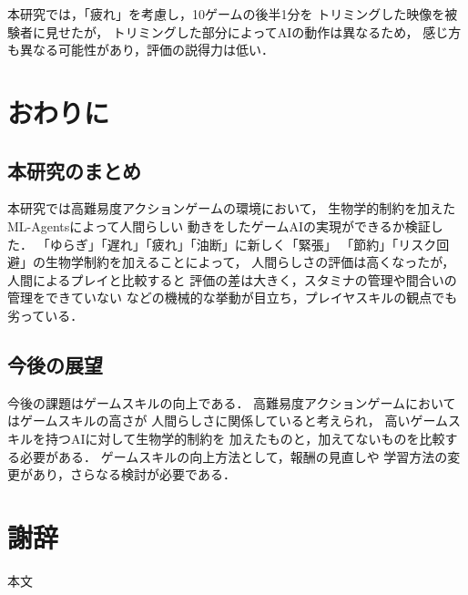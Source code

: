 \documentclass[a4paper,12pt,oneside,openany,titlepage]{jreport}
\begin{document}
本研究では，「疲れ」を考慮し，10ゲームの後半1分を
トリミングした映像を被験者に見せたが，
トリミングした部分によってAIの動作は異なるため，
感じ方も異なる可能性があり，評価の説得力は低い．


\chapter{おわりに}
\thispagestyle{fancy}
\lhead{\leftmark}
\rhead{\thepage}
\renewcommand{\headrulewidth}{1pt}

\section{本研究のまとめ}
本研究では高難易度アクションゲームの環境において，
生物学的制約を加えたML-Agentsによって人間らしい
動きをしたゲームAIの実現ができるか検証した．
「ゆらぎ」「遅れ」「疲れ」「油断」に新しく「緊張」
「節約」「リスク回避」の生物学制約を加えることによって，
人間らしさの評価は高くなったが，人間によるプレイと比較すると
評価の差は大きく，スタミナの管理や間合いの管理をできていない
などの機械的な挙動が目立ち，プレイヤスキルの観点でも劣っている．

\section{今後の展望}
今後の課題はゲームスキルの向上である．
高難易度アクションゲームにおいてはゲームスキルの高さが
人間らしさに関係していると考えられ，
高いゲームスキルを持つAIに対して生物学的制約を
加えたものと，加えてないものを比較する必要がある．
ゲームスキルの向上方法として，報酬の見直しや
学習方法の変更があり，さらなる検討が必要である．
 


\newpage


\chapter*{謝辞}
\thispagestyle{plain}
\lhead{\leftmark}
\rhead{\thepage}
\renewcommand{\headrulewidth}{1pt}
本文

\newpage
\end{document}

